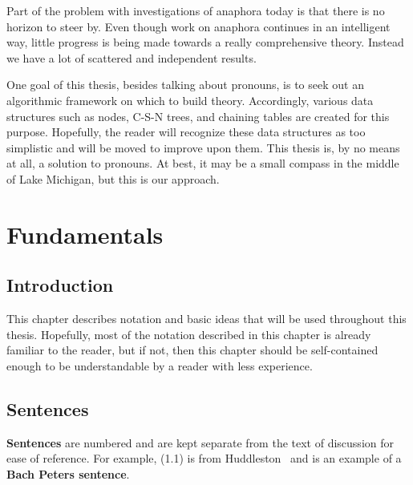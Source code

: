 \documentclass{article}
\begin{document}
Part of the problem with investigations of anaphora today is
that there is no horizon to steer by. Even though work on
anaphora continues in an intelligent way, little progress is
being made towards a really comprehensive theory. Instead we
have a lot of scattered and independent results.

One goal of this thesis, besides talking about pronouns, is to
seek out an algorithmic framework on which to build
theory. Accordingly, various data structures such as nodes,
C-S-N trees, and chaining tables are created for this
purpose. Hopefully, the reader will recognize these data
structures as too simplistic and will be moved to improve upon
them. This thesis is, by no means at all, a solution to
pronouns. At best, it may be a small compass in the middle of
Lake Michigan, but this is our approach.

%
%

\section{Fundamentals}


\subsection{Introduction}

This chapter describes notation and basic ideas that will be
used throughout this thesis. Hopefully, most of the notation
described in this chapter is already familiar to the reader, but
if not, then this chapter should be self-contained enough to be
understandable by a reader with less experience.


\subsection{Sentences}

 \textbf{Sentences} are numbered and are kept
separate from the text of discussion for ease of reference. For
example, (1.1) is from Huddleston~\cite{Huddleston78} and is
an example of a 
\textbf{Bach Peters sentence}.
\end{document}
